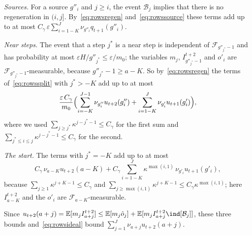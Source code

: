 \documentclass[11pt]{amsart}
\theoremstyle{definition}
\theoremstyle{remark}
\newcommand{\eps}{\varepsilon}
\newcommand{\EE}{\mathbb{E}}
\newcommand{\cF}{\mathcal{F}}
\begin{document}
\emph{Sources.} For a source $g''_i$ and $j\ge i$, the event $\mathcal B_j$ implies that there is
no regeneration in $(i,j]$. By~\eqref{eq:rowsregen} and~\eqref{eq:rowssource} these terms add up
to at most $C_\gamma\,\eps\sum_{i=1-K}^{J}\nu_{g''_i}q_{t+1}(g''_i)$.

\emph{Near steps.} The event that a step $j^*$ is a near step is independent of $\cF_{g''_{j^*}-1}$ and
has probability at most $\eps H/g''_{j^*}\le\eps/m_0$; the variables $m_j$, $I^{t+2}_{g''_{j^*}-1}$
and $o'_i$ are $\cF_{g''_{j^*}-1}$-measurable, because $g''_{j^*}-1\ge a-K$. So by~\eqref{eq:rowsregen} the terms
of~\eqref{eq:rowssplit} with $j^*>-K$ add up to at most
\[
\frac{\eps\,C_\gamma}{m_0}\Bigl(\sum_{i=-K}^{J-1}\nu_{g''_i}u_{t+2}(g''_i)+\sum_{i=1-K}^{J}\nu_{g'_i}u_{t+1}(g'_i)\Bigr),
\]
where we used $\sum_{j\ge j^*}\kappa^{j-j^*-1}\le C_\gamma$ for the first sum and $\sum_{j^*\le i\le j}\kappa^{j-j^*-1}\le C_\gamma$ for the second.

\emph{The start.} The terms with $j^*=-K$ add up to at most
\[
C_\gamma\,\nu_{a-K}u_{t+2}(a-K)+C_\gamma\sum_{i=1-K}^{J}\kappa^{\max(i,1)}\,\nu_{g'_i}u_{t+1}(g'_i),
\]
because $\sum_{j\ge1}\kappa^{j+K-1}\le C_\gamma$ and $\sum_{j\ge\max(i,1)}\kappa^{j+K-1}\le C_\gamma\kappa^{\max(i,1)}$; here $I^{t+2}_{a-K}$ and the $o'_i$ are $\cF_{a-K}$-measurable.

Since $u_{t+2}(a+j)=\EE[m_jI^{t+2}_{a+j}]\le\EE[m_j\hat o_j]+\EE[m_jI^{t+2}_{a+j}\ind[\mathcal B_j]]$,
these three bounds and~\eqref{eq:rowsideal} bound $\sum_{j=1}^{J}\nu_{a+j}u_{t+2}(a+j)$.
\end{document}
